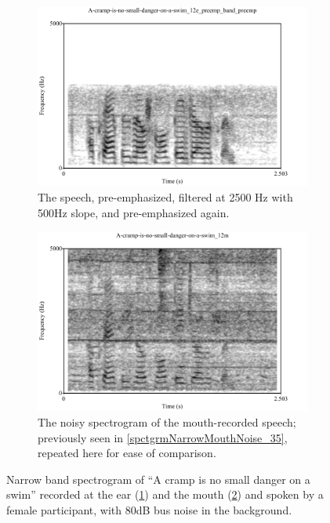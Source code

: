 \begin{figure}[b!]
\centering
\begin{subfigure}{0.475\textwidth}
  \centering
  \includegraphics[width=1\linewidth]{figure/spctgrmNarrowEarNoisePrempFiltPremp.pdf}
  \caption{The \DIFdelbeginFL {}\DIFdelendFL \DIFaddbeginFL {}\DIFaddendFL speech, pre-emphasized, filtered at 2500 Hz with 500Hz slope, and pre-emphasized again.}
  \label{spctgrmNarrowEarNoisePrempFiltPremp_35}
\end{subfigure}%
\hfill
\begin{subfigure}{0.475\textwidth}
  \centering
  \includegraphics[width=1\linewidth]{figure/spctgrmNarrowMthNoise_35.pdf}
  \caption{The noisy spectrogram of the mouth-recorded speech; previously seen in \ref{spctgrmNarrowMouthNoise_35}, repeated here for ease of comparison.}
  \label{spctgrmNarrowMouthNoise_35_compare}
\end{subfigure}
\caption{Narrow band spectrogram of ``A cramp is no small danger on a swim'' recorded at the ear (\ref{spctgrmNarrowEarNoisePrempFiltPremp_35}) and the mouth (\ref{spctgrmNarrowMouthNoise_35_compare}) and spoken by a female participant, with 80dB bus noise in the background.}
\label{fig:ear_pfp}
\end{figure}
